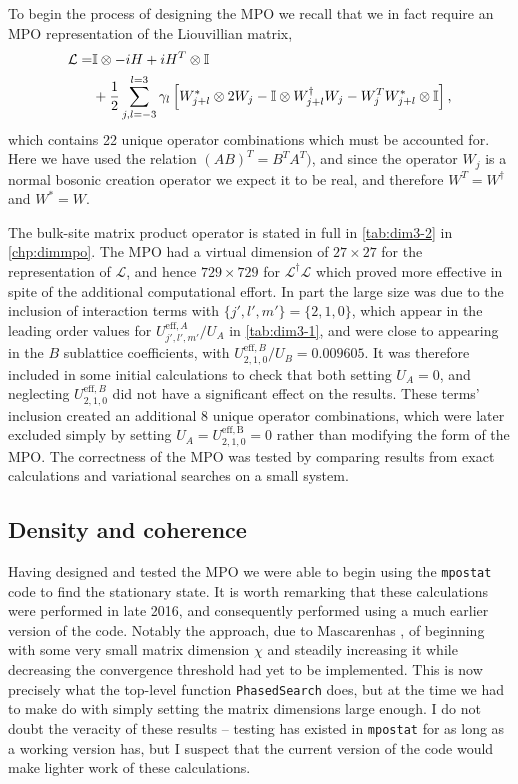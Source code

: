 To begin the process of designing the MPO we recall that we in fact require an MPO representation of the Liouvillian matrix,
\begin{align}
	\mathcal{L} = &\mathbb{I} \otimes -iH + iH^{T} \otimes \mathbb{I} \notag \\
	&+ \frac{1}{2}\sum_{j,l=-3}^{l=3}\gamma_{l}\left[ W_{j+l}^{*} \otimes 2W_{j} - \mathbb{I} \otimes W_{j+l}^{\dagger}W_{j} - W_{j}^{T}W_{j+l}^{*} \otimes \mathbb{I} \right],
	\label{eq:dim3-4}
\end{align}
which contains 22 unique operator combinations which must be accounted for. Here we have used the relation \((AB)^{T} = B^{T}A^{T})\), and since the operator \(W_{j}\) is a normal bosonic creation operator we expect it to be real, and therefore \(W^{T} = W^{\dagger}\) and \(W^{*} = W\).

The bulk-site matrix product operator is stated in full in \cref{tab:dim3-2} in \cref{chp:dimmpo}. The MPO had a virtual dimension of \(27 \times 27\) for the representation of \(\mathcal{L}\), and hence \(729 \times 729\) for \(\mathcal{L}^{\dagger}\mathcal{L}\) which proved more effective in spite of the additional computational effort. In part the large size was due to the inclusion of interaction terms with \(\{j',l',m'\} = \{2,1,0\}\), which appear in the leading order values for \(U^{\mathrm{eff},A}_{j',l',m'} / U_{A}\) in \cref{tab:dim3-1}, and were close to appearing in the \(B\) sublattice coefficients, with \(U^{\mathrm{eff},B}_{2,1,0} / U_{B} = 0.009605\). It was therefore included in some initial calculations to check that both setting \(U_{A} = 0\), and neglecting \(U^{\mathrm{eff},B}_{2,1,0}\) did not have a significant effect on the results. These terms' inclusion created an additional 8 unique operator combinations, which were later excluded simply by setting \(U_{A} = U^{\mathrm{eff,B}}_{2,1,0} = 0\) rather than modifying the form of the MPO. The correctness of the MPO was tested by comparing results from exact calculations and variational searches on a small system.

\subsection{Density and coherence}
Having designed and tested the MPO we were able to begin using the \lstinline$mpostat$ code to find the stationary state. It is worth remarking that these calculations were performed in late 2016, and consequently performed using a much earlier version of the code. Notably the approach, due to Mascarenhas \cite{Mascarenhas2015}, of beginning with some very small matrix dimension \(\chi\) and steadily increasing it while decreasing the convergence threshold had yet to be implemented. This is now precisely what the top-level function \lstinline$PhasedSearch$ does, but at the time we had to make do with simply setting the matrix dimensions large enough. I do not doubt the veracity of these results -- testing has existed in \lstinline$mpostat$ for as long as a working version has, but I suspect that the current version of the code would make lighter work of these calculations.

